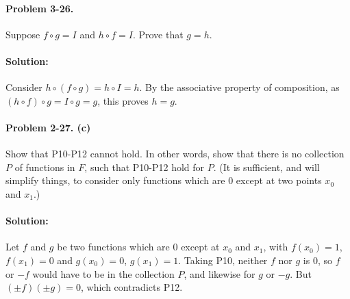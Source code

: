 \documentclass{article}
\begin{document}
\paragraph{Problem 3-26.} Suppose $f \circ g = I$ and $h \circ f = I$. Prove
that $g = h$.

\paragraph{Solution:} Consider $h \circ (f \circ g) = h \circ I = h$. By the
associative property of composition, as $(h \circ f) \circ g = I \circ g = g$,
this proves $h = g$.

\paragraph{Problem 2-27. (c)} Show that P10-P12 cannot hold. In other words,
show that there is no collection $P$ of functions in $F$, such that P10-P12
hold for $P$. (It is sufficient, and will simplify things, to consider only
functions which are 0 except at two points $x_0$ and $x_1$.)

\paragraph{Solution:} Let $f$ and $g$ be two functions which are 0 except at
$x_0$ and $x_1$, with $f(x_0) = 1$, $f(x_1) = 0$ and $g(x_0) = 0$, $g(x_1) =
1$. Taking P10, neither $f$ nor $g$ is 0, so $f$ or $-f$ would have to be in
the collection $P$, and likewise for $g$ or $-g$. But $(\pm f)(\pm g) = 0$,
which contradicts P12.
\end{document}
